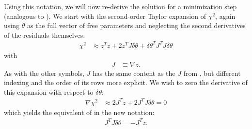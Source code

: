 Using this notation, we will now re-derive the solution for a minimization step (analogous to ).
We start with the second-order Taylor expansion of $\chi^2$, again using $\theta$ as the full vector of free parameters and neglecting the second derivatives of the residuals themselves:
\begin{align}
    \chi^2 &\approx z^Tz + 2z^T J\delta\theta
    + \delta\theta^T J^T\!J \delta\theta
\end{align}
with
\begin{align}
    J &\equiv \nabla z.
\end{align}
As with the other symbols, $J$ has the same content as the $J$ from , but different indexing and the order of its rows more explicit.
We wish to zero the derivative of this expansion with respect to $\delta\theta$:
\begin{align}
    \nabla\chi^2 &\approx 2J^T\!z + 2J^T\!J \delta\theta = 0
\end{align}
which yields the equivalent of  in the new notation:
\begin{align}
    J^T\!J \delta\theta = -J^T\!z. \label{eq:vp_gradient_equation}
\end{align}

